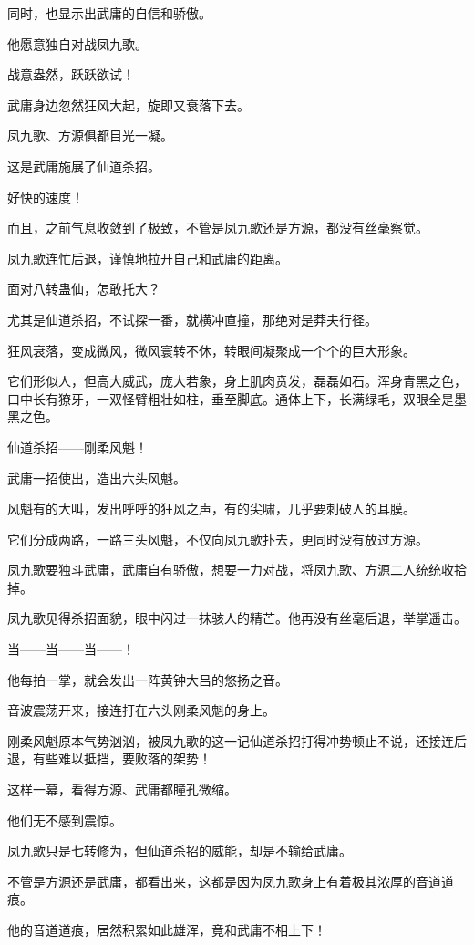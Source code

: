 \begin{this_body}
同时，也显示出武庸的自信和骄傲。

他愿意独自对战凤九歌。

战意盎然，跃跃欲试！

武庸身边忽然狂风大起，旋即又衰落下去。

凤九歌、方源俱都目光一凝。

这是武庸施展了仙道杀招。

好快的速度！

而且，之前气息收敛到了极致，不管是凤九歌还是方源，都没有丝毫察觉。

凤九歌连忙后退，谨慎地拉开自己和武庸的距离。

面对八转蛊仙，怎敢托大？

尤其是仙道杀招，不试探一番，就横冲直撞，那绝对是莽夫行径。

狂风衰落，变成微风，微风寰转不休，转眼间凝聚成一个个的巨大形象。

它们形似人，但高大威武，庞大若象，身上肌肉贲发，磊磊如石。浑身青黑之色，口中长有獠牙，一双怪臂粗壮如柱，垂至脚底。通体上下，长满绿毛，双眼全是墨黑之色。

仙道杀招——刚柔风魁！

武庸一招使出，造出六头风魁。

风魁有的大叫，发出呼呼的狂风之声，有的尖啸，几乎要刺破人的耳膜。

它们分成两路，一路三头风魁，不仅向凤九歌扑去，更同时没有放过方源。

凤九歌要独斗武庸，武庸自有骄傲，想要一力对战，将凤九歌、方源二人统统收拾掉。

凤九歌见得杀招面貌，眼中闪过一抹骇人的精芒。他再没有丝毫后退，举掌遥击。

当——当——当——！

他每拍一掌，就会发出一阵黄钟大吕的悠扬之音。

音波震荡开来，接连打在六头刚柔风魁的身上。

刚柔风魁原本气势汹汹，被凤九歌的这一记仙道杀招打得冲势顿止不说，还接连后退，有些难以抵挡，要败落的架势！

这样一幕，看得方源、武庸都瞳孔微缩。

他们无不感到震惊。

凤九歌只是七转修为，但仙道杀招的威能，却是不输给武庸。

不管是方源还是武庸，都看出来，这都是因为凤九歌身上有着极其浓厚的音道道痕。

他的音道道痕，居然积累如此雄浑，竟和武庸不相上下！


\end{this_body}
